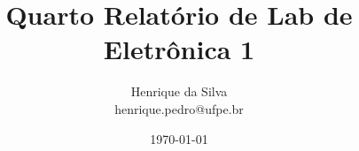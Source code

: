 \documentclass[12pt,twoside, a4paper]{article}
\begin{document}
\title{Quarto Relatório de Lab de Eletrônica 1}
\author{Henrique da Silva \\ henrique.pedro@ufpe.br}
\date{\today}

\maketitle
{}
\tableofcontents
\newpage















% 
\end{document}
